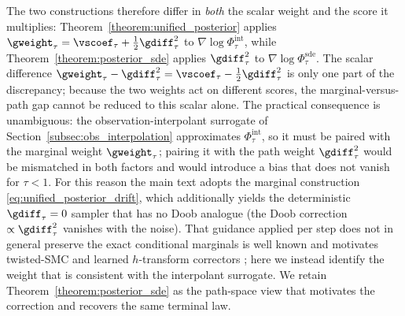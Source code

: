 The two constructions therefore differ in \emph{both} the scalar weight and the score it multiplies: Theorem~\ref{theorem:unified_posterior} applies $\gweight_\tau=\vscoef_\tau+\tfrac12\gdiff_\tau^2$ to $\nabla\log\Phi_\tau^{\mathrm{int}}$, while Theorem~\ref{theorem:posterior_sde} applies $\gdiff_\tau^2$ to $\nabla\log\Phi_\tau^{\mathrm{sde}}$. The scalar difference $\gweight_\tau-\gdiff_\tau^2=\vscoef_\tau-\tfrac12\gdiff_\tau^2$ is only one part of the discrepancy; because the two weights act on different scores, the marginal-versus-path gap cannot be reduced to this scalar alone. The practical consequence is unambiguous: the observation-interpolant surrogate of Section~\ref{subsec:obs_interpolation} approximates $\Phi_\tau^{\mathrm{int}}$, so it must be paired with the marginal weight $\gweight_\tau$; pairing it with the path weight $\gdiff_\tau^2$ would be mismatched in both factors and would introduce a bias that does not vanish for $\tau<1$. For this reason the main text adopts the marginal construction \eqref{eq:unified_posterior_drift}, which additionally yields the deterministic $\gdiff_\tau=0$ sampler that has no Doob analogue (the Doob correction $\propto\gdiff_\tau^2$ vanishes with the noise). That guidance applied per step does not in general preserve the exact conditional marginals is well known and motivates twisted-SMC and learned $h$-transform correctors \cite{wu_practical_2023, denker_deft_2024}; here we instead identify the weight that is consistent with the interpolant surrogate. We retain Theorem~\ref{theorem:posterior_sde} as the path-space view that motivates the correction and recovers the same terminal law.

